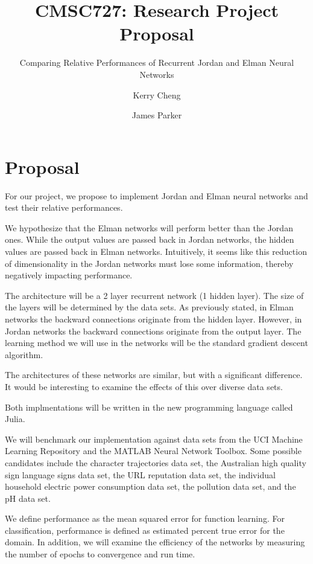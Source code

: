 \documentclass[12pt]{article}
\title{CMSC727: Research Project Proposal}
\subtitle{Comparing Relative Performances of Recurrent Jordan and Elman Neural Networks}
\author{Kerry Cheng \and James Parker}
\begin{document}
\maketitle

\section{Proposal}

For our project, we propose to implement Jordan and Elman neural networks and test their relative performances.

We hypothesize that the Elman networks will perform better than the Jordan ones.
While the output values are passed back in Jordan networks, the hidden values are passed back in Elman networks.
Intuitively, it seems like this reduction of dimensionality in the Jordan networks must lose some information, thereby negatively impacting performance.

The architecture will be a 2 layer recurrent network (1 hidden layer). The size of the layers will be determined by the data sets.
As previously stated, in Elman networks the backward connections originate from the hidden layer.
However, in Jordan networks the backward connections originate from the output layer.
The learning method we will use in the networks will be the standard gradient descent algorithm.

The architectures of these networks are similar, but with a significant difference. It would be interesting to examine the effects of this over diverse data sets.

Both implmentations will be written in the new programming language called Julia.

We will benchmark our implementation against data sets from the UCI Machine Learning Repository and the MATLAB Neural Network Toolbox. Some possible candidates include the character trajectories data set, 
the Australian high quality sign language signs data set, 
the URL reputation data set, 
the individual household electric power consumption data set, 
the pollution data set, 
and the pH data set.

We define performance as the mean squared error for function learning.
For classification, performance is defined as estimated percent true error for the domain.
In addition, we will examine the efficiency of the networks by measuring the number of epochs to convergence and run time.
\end{document}
